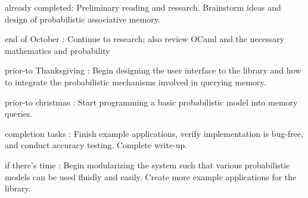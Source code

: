 \documentclass{sig-alternate}
\begin{document}
\begin{itemize*}
	\item {\sc already completed}: Preliminary reading and research. Brainstorm ideas and design of probabilistic associative memory. \vspace{3pt}
	\item {\sc end of October} : Continue to research; also review OCaml and the necessary mathematics and probability\vspace{3pt}
	\item {\sc prior-to Thanksgiving} : Begin designing the user interface to the library and how to integrate the probabilistic mechanisms involved in querying memory.\vspace{3pt}
	\item {\sc prior-to christmas} : Start programming a basic probabilistic model into memory queries.\vspace{3pt}
	\item {\sc completion tasks} : Finish example applications, verify implementation is bug-free, and conduct accuracy testing. Complete write-up.\vspace{3pt}
	\item {\sc if there's time} : Begin modularizing the system such that various probabilistic models can be used fluidly and easily. Create more example applications for the library.
\end{itemize*}


\vspace{175pt}

\end{document}
